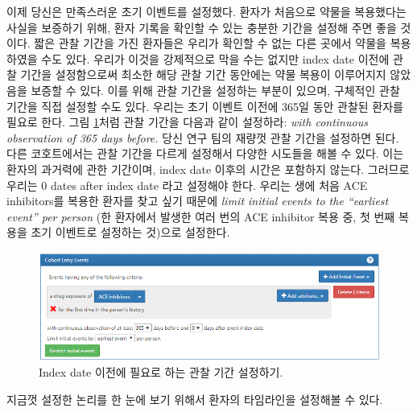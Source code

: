 \documentclass[11pt]{book}
\theoremstyle{definition}
\theoremstyle{definition}
\theoremstyle{definition}
\theoremstyle{remark}
\begin{document}
이제 당신은 만족스러운 초기 이벤트를 설정했다. 환자가 처음으로 약물을
복용했다는 사실을 보증하기 위해, 환자 기록을 확인할 수 있는 충분한
기간을 설정해 주면 좋을 것이다. 짧은 관찰 기간을 가진 환자들은 우리가
확인할 수 없는 다른 곳에서 약물을 복용하였을 수도 있다. 우리가 이것을
강제적으로 막을 수는 없지만 index date 이전에 관찰 기간을 설정함으로써
최소한 해당 관찰 기간 동안에는 약물 복용이 이루어지지 않았음을 보증할 수
있다. 이를 위해 관찰 기간을 설정하는 부분이 있으며, 구체적인 관찰 기간을
직접 설정할 수도 있다. 우리는 초기 이벤트 이전에 365일 동안 관찰된
환자를 필요로 한다. 그림 \ref{fig:initialEventAce}처럼 관찰 기간을
다음과 같이 설정하라: \emph{with continuous observation of 365 days
before.} 당신 연구 팀의 재량껏 관찰 기간을 설정하면 된다. 다른
코호트에서는 관찰 기간을 다르게 설정해서 다양한 시도들을 해볼 수 있다.
이는 환자의 과거력에 관한 기간이며, index date 이후의 시간은 포함하지
않는다. 그러므로 우리는 0 dates after index date 라고 설정해야 한다.
우리는 생에 처음 ACE inhibitors를 복용한 환자를 찾고 싶기 때문에
\emph{limit initial events to the ``earliest event'' per person} (한
환자에서 발생한 여러 번의 ACE inhibitor 복용 중, 첫 번째 복용을 초기
이벤트로 설정하는 것)으로 설정한다.

\begin{figure}

{\centering \includegraphics[width=1\linewidth]{images/Cohorts/initialEventAce} 

}

\caption{Index date 이전에 필요로 하는 관찰 기간 설정하기.}\label{fig:initialEventAce}
\end{figure}

지금껏 설정한 논리를 한 눈에 보기 위해서 환자의 타임라인을 설정해볼 수
있다.
\end{document}
